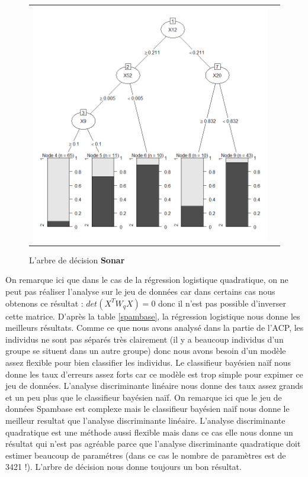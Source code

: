 \documentclass[a4paper,11pt,oneside,roman]{article}
\begin{document}
\begin{figure}[htb]
    \centering
    \begin{tabular}{cc}
    \includegraphics[scale = .4]{./discrimination/Sonar/tree_plot.png} &
    \end{tabular}
    \caption{L'arbre de décision \textbf{Sonar}}
    \label{fig:my_label}
\end{figure}
On remarque ici que dans le cas de la régression logistique quadratique, on ne peut pas réaliser l'analyse sur le jeu de données car dans certains cas nous obtenons ce résultat : $det(X^{T}W_{q}X) =  0$ donc il n'est pas possible d'inverser cette matrice.  
\newline
D'après la table \ref{spambase}, la régression logistique nous donne les meilleurs résultats. Comme ce que nous avons analysé dans la partie de l'ACP, les individus ne sont pas séparés très clairement (il y a beaucoup individus d'un groupe se situent dans un autre groupe) donc nous avons besoin d'un modèle assez flexible pour bien classifier les individus. Le classifieur bayésien naïf nous donne les taux d'erreurs assez forts car ce modèle est trop simple pour expimer ce jeu de données. L'analyse discriminante linéaire nous donne des taux assez grands et un peu plus que le classifieur bayésien naïf. On remarque ici que le jeu de données Spambase est complexe mais le classifieur bayésien naïf nous donne le meilleur resultat que l'analyse discriminante linéaire. L'analyse discriminante quadratique est une méthode aussi flexible mais dans ce cas elle nous donne un résultat qui n'est pas agréable parce que l'analyse discriminante quadratique doit estimer beaucoup de paramétres (dans ce cas le nombre de paramètres est de 3421 !). L'arbre de décision nous donne toujours un bon résultat. \newline
\end{document}
